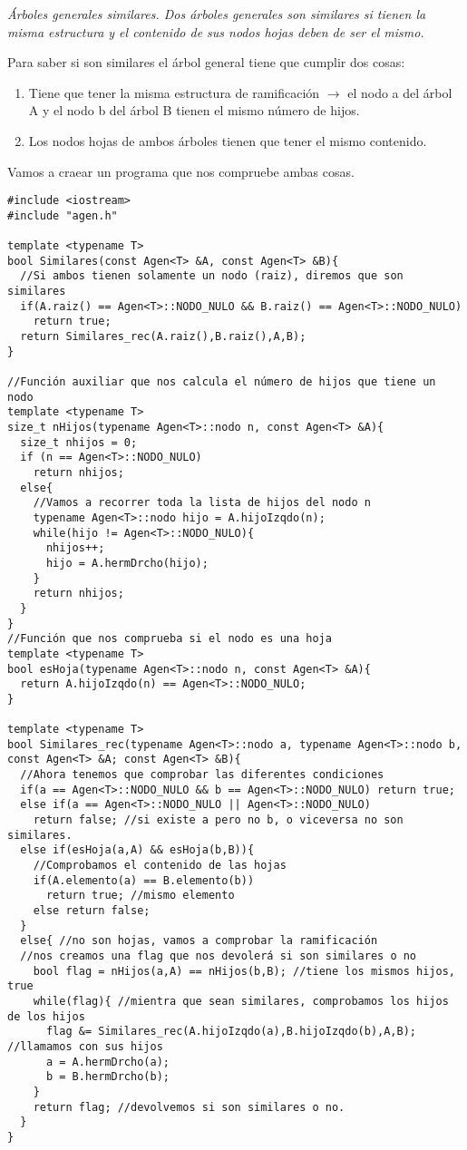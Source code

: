 \textbf{}\textit{ Árboles generales similares. Dos árboles generales son similares si tienen la misma estructura y el contenido de sus nodos hojas deben de ser el mismo.}

Para saber si son similares el árbol general tiene que cumplir dos cosas:
\begin{enumerate}
  \item Tiene que tener la misma estructura de ramificación \(\rightarrow\) el nodo a del árbol A y el nodo b del árbol B tienen el mismo número de hijos.
  \item Los nodos hojas de ambos árboles tienen que tener el mismo contenido.
\end{enumerate}

Vamos a craear un programa que nos compruebe ambas cosas.
\begin{verbatim}
#include <iostream>
#include "agen.h"

template <typename T>
bool Similares(const Agen<T> &A, const Agen<T> &B){
  //Si ambos tienen solamente un nodo (raiz), diremos que son similares
  if(A.raiz() == Agen<T>::NODO_NULO && B.raiz() == Agen<T>::NODO_NULO)
    return true;
  return Similares_rec(A.raiz(),B.raiz(),A,B);
}

//Función auxiliar que nos calcula el número de hijos que tiene un nodo
template <typename T>
size_t nHijos(typename Agen<T>::nodo n, const Agen<T> &A){
  size_t nhijos = 0;
  if (n == Agen<T>::NODO_NULO)
    return nhijos;
  else{
    //Vamos a recorrer toda la lista de hijos del nodo n
    typename Agen<T>::nodo hijo = A.hijoIzqdo(n);
    while(hijo != Agen<T>::NODO_NULO){
      nhijos++;
      hijo = A.hermDrcho(hijo);
    }
    return nhijos;
  }
}
//Función que nos comprueba si el nodo es una hoja
template <typename T>
bool esHoja(typename Agen<T>::nodo n, const Agen<T> &A){
  return A.hijoIzqdo(n) == Agen<T>::NODO_NULO;
}

template <typename T>
bool Similares_rec(typename Agen<T>::nodo a, typename Agen<T>::nodo b, const Agen<T> &A; const Agen<T> &B){
  //Ahora tenemos que comprobar las diferentes condiciones
  if(a == Agen<T>::NODO_NULO && b == Agen<T>::NODO_NULO) return true;
  else if(a == Agen<T>::NODO_NULO || Agen<T>::NODO_NULO)
    return false; //si existe a pero no b, o viceversa no son similares.
  else if(esHoja(a,A) && esHoja(b,B)){
    //Comprobamos el contenido de las hojas
    if(A.elemento(a) == B.elemento(b)) 
      return true; //mismo elemento
    else return false;
  }
  else{ //no son hojas, vamos a comprobar la ramificación
  //nos creamos una flag que nos devolerá si son similares o no
    bool flag = nHijos(a,A) == nHijos(b,B); //tiene los mismos hijos, true
    while(flag){ //mientra que sean similares, comprobamos los hijos de los hijos
      flag &= Similares_rec(A.hijoIzqdo(a),B.hijoIzqdo(b),A,B); //llamamos con sus hijos
      a = A.hermDrcho(a);
      b = B.hermDrcho(b);
    }
    return flag; //devolvemos si son similares o no.
  }
}
\end{verbatim}

